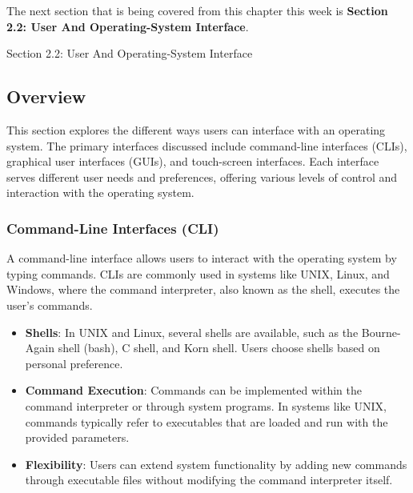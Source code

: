 The next section that is being covered from this chapter this week is \textbf{Section 2.2: User And Operating-System Interface}.

\begin{notes}{Section 2.2: User And Operating-System Interface}
    \subsection*{Overview}

    This section explores the different ways users can interface with an operating system. The primary interfaces discussed include command-line interfaces (CLIs), graphical user interfaces (GUIs), 
    and touch-screen interfaces. Each interface serves different user needs and preferences, offering various levels of control and interaction with the operating system.
    
    \subsubsection*{Command-Line Interfaces (CLI)}
    
    A command-line interface allows users to interact with the operating system by typing commands. CLIs are commonly used in systems like UNIX, Linux, and Windows, where the command interpreter, also 
    known as the shell, executes the user's commands.
    
    \begin{highlight}
    
    \begin{itemize}
        \item \textbf{Shells}: In UNIX and Linux, several shells are available, such as the Bourne-Again shell (bash), C shell, and Korn shell. Users choose shells based on personal preference.
        \item \textbf{Command Execution}: Commands can be implemented within the command interpreter or through system programs. In systems like UNIX, commands typically refer to executables that are 
        loaded and run with the provided parameters.
        \item \textbf{Flexibility}: Users can extend system functionality by adding new commands through executable files without modifying the command interpreter itself.
    \end{itemize}
    
    \end{highlight}
    

\end{notes}
